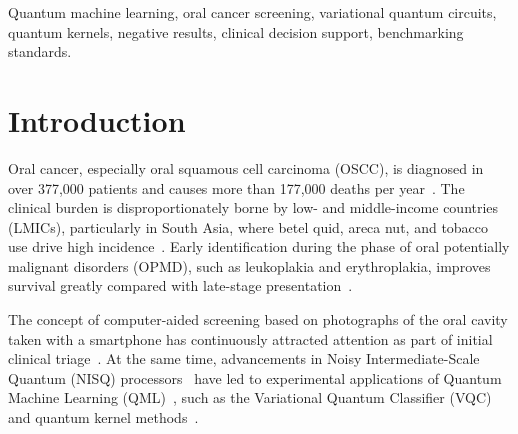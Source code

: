 \documentclass[conference]{IEEEtran}
\begin{document}
\begin{IEEEkeywords}
Quantum machine learning, oral cancer screening, variational quantum circuits, quantum kernels, negative results, clinical decision support, benchmarking standards.
\end{IEEEkeywords}

\section{Introduction}
Oral cancer, especially oral squamous cell carcinoma (OSCC), is diagnosed in over 377,000 patients and causes more than 177,000 deaths per year~\cite{sung2021global}. The clinical burden is disproportionately borne by low- and middle-income countries (LMICs), particularly in South Asia, where betel quid, areca nut, and tobacco use drive high incidence~\cite{sunny2019tele, piyarathne2024comprehensive}. Early identification during the phase of oral potentially malignant disorders (OPMD), such as leukoplakia and erythroplakia, improves survival greatly compared with late-stage presentation~\cite{welikala2020automated, warin2022deep}.

The concept of computer-aided screening based on photographs of the oral cavity taken with a smartphone has continuously attracted attention as part of initial clinical triage~\cite{camalan2021convolutional, welikala2020automated, smartom2026dataset}. At the same time, advancements in Noisy Intermediate-Scale Quantum (NISQ) processors~\cite{preskill2018quantum} have led to experimental applications of Quantum Machine Learning (QML)~\cite{biamonte2017quantum}, such as the Variational Quantum Classifier (VQC) and quantum kernel methods~\cite{cerezo2021variational, schuld2019quantum, havlicek2019supervised, abbas2021power}.
\end{document}
